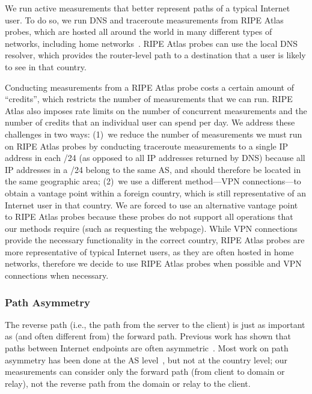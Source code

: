 We run active measurements that better represent paths of a typical Internet user. To do so, we run
DNS and traceroute measurements from RIPE Atlas probes, which are hosted
all around the world in many different types of networks, including home
networks~\cite{ripe_atlas}.  RIPE Atlas probes can use the local DNS
resolver, which provides the router-level path to a destination that a user is
 likely to see in that country.  

Conducting measurements from a RIPE Atlas probe costs a certain
amount of ``credits'', which restricts the number of measurements that we
can run.  RIPE Atlas also imposes rate limits on the number of
concurrent measurements and the number of credits that an individual
user can spend per day.  We address these challenges in two ways: (1)~we
reduce the number of measurements we must run on RIPE Atlas
probes by conducting traceroute measurements to a single IP address in
each /24 (as opposed to all IP addresses returned by DNS) because all IP
addresses in a /24 belong to the same AS, and should therefore be
located in the same geographic area; (2)~we use a different method---VPN
connections---to obtain a vantage point within a foreign country, which
is still representative of an Internet user in that country.  We are forced to 
use an alternative vantage point to RIPE Atlas probes because these probes 
do not support all operations that our methods require (such as requesting 
the webpage).  While VPN connections provide the necessary functionality in 
the correct country, RIPE Atlas probes are more representative of typical 
Internet users, as they are often hosted in home networks, therefore we decide
 to use RIPE Atlas probes when possible and VPN connections when necessary.

\subsubsection{Path Asymmetry}
\label{path_sym}

The reverse path (i.e., the path from the server to the client) is just as important as (and often different from) the
forward path.   Previous work has shown that paths between Internet endpoints
are often asymmetric~\cite{he2005routing}.  Most work on path asymmetry has
been done at the AS level~\cite{paxson1997end,gao2001inferring,he2005routing,he2004quantifying}, but not at the country level; our measurements can
consider only the forward path (from client to domain or relay), not the
reverse path from the domain or relay to the client.


